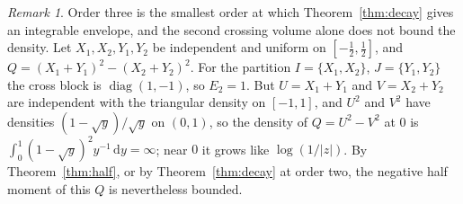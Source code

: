 \documentclass[11pt]{amsart}
\numberwithin{equation}{section}
\theoremstyle{definition}
\theoremstyle{remark}
\newtheorem{remark}[theorem]{Remark}
\newcommand{\1}{\mathbf 1}
\newcommand{\dd}{\,\mathrm d}
\DeclareMathOperator{\diag}{diag}
\newcommand{\abs}[1]{\lvert #1\rvert}
\begin{document}
\begin{remark}
Order three is the smallest order at which Theorem~\ref{thm:decay} gives an integrable envelope, and the second crossing volume alone does not bound the density. Let $X_1,X_2,Y_1,Y_2$ be independent and uniform on $[-\frac12,\frac12]$, and $Q=(X_1+Y_1)^2-(X_2+Y_2)^2$. For the partition $I=\{X_1,X_2\}$, $J=\{Y_1,Y_2\}$ the cross block is $\diag(1,-1)$, so $E_2=1$. But $U=X_1+Y_1$ and $V=X_2+Y_2$ are independent with the triangular density on $[-1,1]$, and $U^2$ and $V^2$ have densities $(1-\sqrt y)/\sqrt y$ on $(0,1)$, so the density of $Q=U^2-V^2$ at $0$ is $\int_0^1(1-\sqrt y)^2y^{-1}\dd y=\infty$; near $0$ it grows like $\log(1/\abs z)$. By Theorem~\ref{thm:half}, or by Theorem~\ref{thm:decay} at order two, the negative half moment of this $Q$ is nevertheless bounded.
\end{remark}
\end{document}
